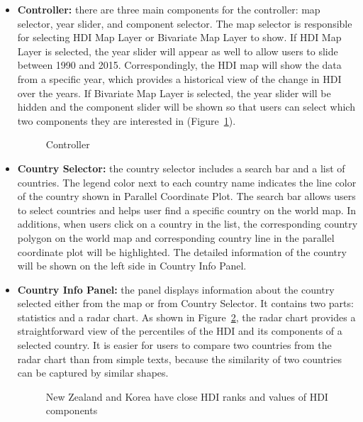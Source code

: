 \begin{itemize}
	\item \textbf{Controller:} there are three main components for the controller: map selector, year slider, and component selector. The map selector is responsible for selecting HDI Map Layer or Bivariate Map Layer to show. If HDI Map Layer is selected, the year slider will appear as well to allow users to slide between 1990 and 2015. Correspondingly, the HDI map will show the data from a specific year, which provides a historical view of the change in HDI over the years. If Bivariate Map Layer is selected, the year slider will be hidden and the component slider will be shown so that users can select which two components they are interested in (Figure~\ref{fig:controller}).
	\begin{figure}[t]
		\centering
        \qquad
		\caption{Controller}
		\label{fig:controller}
	\end{figure}
    \item \textbf{Country Selector:} the country selector includes a search bar and a list of countries. The legend color next to each country name indicates the line color of the country shown in Parallel Coordinate Plot. The search bar allows users to select countries and helps user find a specific country on the world map. In additions, when users click on a country in the list, the corresponding country polygon on the world map and corresponding country line in the parallel coordinate plot will be highlighted. The detailed information of the country will be shown on the left side in Country Info Panel.
    \item \textbf{Country Info Panel:} the panel displays information about the country selected either from the map or from Country Selector. It contains two parts: statistics and a radar chart. As shown in Figure~\ref{fig:panel}, the radar chart provides a straightforward view of the percentiles of the HDI and its components of a selected country. It is easier for users to compare two countries from the radar chart than from simple texts, because the similarity of two countries can be captured by similar shapes.
    \begin{figure}[t]
    	\centering
        \qquad
    	\caption{New Zealand and Korea have close HDI ranks and values of HDI components}
    	\label{fig:panel}
    \end{figure}
\end{itemize}

